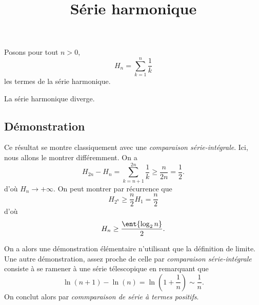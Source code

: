 \documentclass[fontsize=12pt,twoside=false,parskip=half, french]{scrartcl}
\title{Série harmonique}
\date{}
\author{}
\begin{document}
\maketitle
    Posons pour tout $n > 0$,
    \[
        H_n  = \sum_{k = 1}^{n} \frac{1}{k}
    \]
    les termes de la série harmonique.
   \begin{Theoreme}
    La série harmonique diverge.
   \end{Theoreme}
   \subsection{Démonstration}
      Ce résultat se montre classiquement avec une \emph{comparaison série-intégrale}.
      Ici, nous allons le montrer différemment. 
      On a
      \[
        H_{2n} - H_n = \sum_{k = n + 1}^{2n} \frac{1}{k} \geq \frac{n}{2n} = \frac{1}{2}.
      \]
      d'où $H_n \to +\infty$. On peut montrer par récurrence que 
      \[    
        H_{2^n} \geq \frac{n}{2} H_1 = \frac{n}{2}
      \]
      d'où
      \[
        H_n \geq \frac{\ent{\log_2 n}}{2}.
      \]
      
      On a alors une démonstration élémentaire n'utilisant que la définition de limite.
      Une autre démonstration, assez proche de celle par \emph{comparaison série-intégrale}
      consiste à se ramener à une série télescopique en remarquant que
      \[
        \ln\left(n + 1\right) - \ln\left(n \right) = \ln\left(1 + \frac{1}{n}\right) \sim \frac{1}{n}.
      \]
      On conclut alors par \emph{commparaison de série à termes positifs}.
\end{document}
